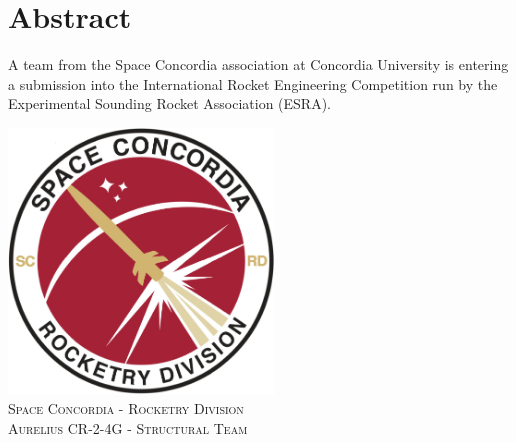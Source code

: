 \documentclass[]{book}
\date{}
\begin{document}
\chapter*{Abstract}
A team from the Space Concordia association at Concordia University is
entering a submission into the International Rocket Engineering
Competition run by the Experimental Sounding Rocket Association (ESRA).

%
%
\begin{titlepage}

\newcommand{\HRule}{\rule{\linewidth}{0.5mm}} %

\center %
 

\includegraphics[width=200pt,height=200pt]{../images/rocketry_logo_large.png}\\[1cm] %
\textsc{\Large Space Concordia - Rocketry Division}\\[0.5cm] %
\textsc{\large Aurelius CR-2-4G - Structural Team}\\[0.5cm] %



\end{titlepage}
\end{document}

